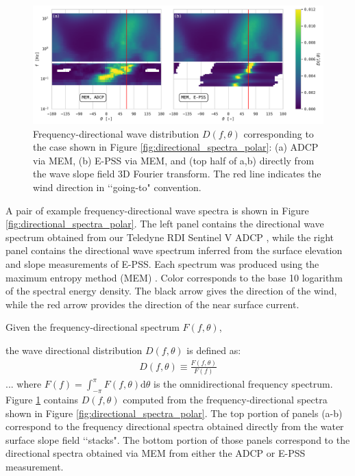 \documentclass[letterpaper,journal]{IEEEtran}
\begin{document}
\begin{figure}[!ht]
    \centering
    \includegraphics[width=\textwidth]{_figures/directional_spectra_combined.pdf}
    \vspace{-20pt}
\caption{Frequency-directional wave distribution $D(f,\theta)$ corresponding to the case shown in Figure \ref{fig:directional_spectra_polar}: (a) ADCP via MEM, (b) E-PSS via MEM, and (top half of a,b) directly from the wave slope field 3D Fourier transform. The red line indicates the wind direction in \lq\lq going-to" convention.}
\label{fig:directional_spectra_combined}
\end{figure}

A pair of example frequency-directional wave spectra is shown in Figure \ref{fig:directional_spectra_polar}. The left panel contains the directional wave spectrum obtained from our Teledyne RDI Sentinel V ADCP \cite{herbers_field_1991}, while the right panel contains the directional wave spectrum inferred from the surface elevation and slope measurements of E-PSS. Each spectrum was produced using the maximum entropy method (MEM) \cite{lygre_maximum_1986}. Color corresponds to the base 10 logarithm of the spectral energy density. The black arrow gives the direction of the wind, while the red arrow provides the direction of the near surface current.

Given the frequency-directional spectrum $F(f,\theta)$,

\newpage

the wave directional distribution $D(f,\theta)$ is defined as:
\begin{align}
    D(f,\theta)\equiv \frac{F(f,\theta)}{F(f)}
\end{align}
... where $F(f)=\int_{-\pi}^{\pi}F(f,\theta)\mathrm{d}\theta$ is the omnidirectional frequency spectrum. Figure \ref{fig:directional_spectra_combined} contains $D(f,\theta)$ computed from the frequency-directional spectra shown in Figure \ref{fig:directional_spectra_polar}. The top portion of panels (a-b) correspond to the frequency directional spectra obtained directly from the water surface slope field \lq\lq stacks". The bottom portion of those panels correspond to the directional spectra obtained via MEM from either the ADCP or E-PSS measurement.
\end{document}
